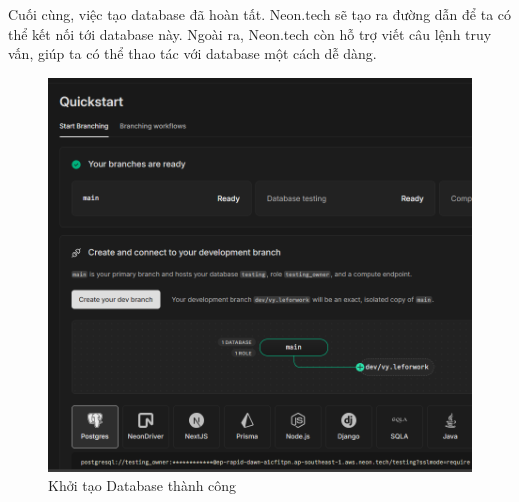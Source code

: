Cuối cùng, việc tạo database đã hoàn tất. Neon.tech sẽ tạo ra đường dẫn để ta có thể kết nối tới database này. Ngoài ra,
Neon.tech còn hỗ trợ viết câu lệnh truy vấn, giúp ta có thể thao tác với database một cách dễ dàng.
\begin{figure}[H]
    \centering
    \includegraphics[width=0.7\linewidth]{Content/Hiện thực hệ thống/images/finishDBcreate.png}
    \vspace{0.5cm}
    \caption{Khởi tạo Database thành công}
    \label{fig:Khởi tạo Database thành công}
\end{figure}